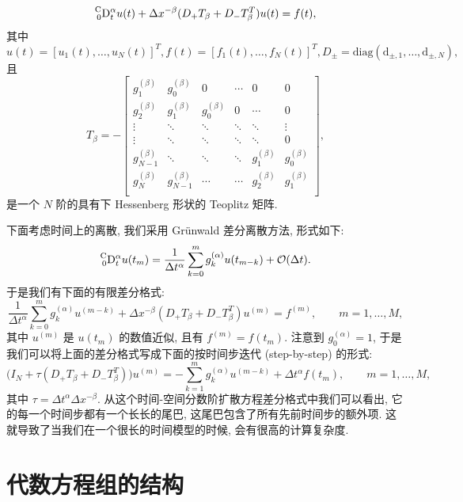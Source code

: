 \documentclass{ecnumaster}
\begin{document}
$$
  \prescript{\mathrm{C}}{0}{\mathrm{D}}_t^{\alpha}u(t) 
   + \Delta x^{-\beta}(D_+T_{\beta} + D_-T_{\beta}^T)u(t) = f(t),
$$
其中
$$ u(t) = [u_1(t), \dots, u_N(t)]^T,
  f(t) = [f_1(t), \dots, f_N(t)]^T,
  D_{\pm} = \mathrm{diag}(\mathrm{d}_{\pm, 1}, \dots, \mathrm{d}_{\pm, N}),
$$
且
\begin{equation}\label{eqtb}
T_{\beta} = - \left[ \begin{matrix} g_1^{(\beta)} & g_0^{(\beta)} & 0 & \cdots & 0 & 0 \\
g_2^{(\beta)} & g_1^{(\beta)} & g_0^{(\beta)} & 0 & \cdots &  0 \\
\vdots & \ddots & \ddots & \ddots & \ddots & \vdots\\
\vdots & \ddots & \ddots & \ddots & \ddots & 0\\
g_{N-1}^{(\beta)}& \ddots & \ddots & \ddots & g_1^{(\beta)} & g_0^{(\beta)}\\
g_{N}^{(\beta)}& g_{N-1}^{(\beta)} & \cdots & \cdots & g_2^{(\beta)} & g_1^{(\beta)}\\
\end{matrix} \right],
\end{equation}
是一个 $N$ 阶的具有下 Hessenberg 形状的 Teoplitz 矩阵.

下面考虑时间上的离散, 我们采用 Gr\"unwald 差分离散方法, 形式如下\cite{P99}:
$$
  \prescript{\mathrm{C}}{0}{\mathrm{D}}_t^{\alpha}u(t_m) =
   \frac{1}{\Delta t^{\alpha}}\sum_{k=0}^m g_k^{(\alpha)}u(t_{m-k}) + \mathcal{O}(\Delta t).
$$
于是我们有下面的有限差分格式:
\begin{equation}\label{eq313}
  \frac{1}{\Delta t^{\alpha}}\sum_{k=0}^m g_k^{(\alpha)}u^{(m-k)} 
  + \Delta x^{-\beta}(D_+T_{\beta} + D_-T_{\beta}^T)u^{(m)} = f^{(m)}, \qquad m = 1, \dots, M,
\end{equation}
其中 $u^{(m)}$ 是 $u(t_m)$ 的数值近似, 且有 $f^{(m)} = f(t_m)$.
注意到 $g_0^{(\alpha)} = 1$, 于是我们可以将上面的差分格式写成下面的按时间步迭代 (step-by-step) 的形式:
$$
  \big(I_N + \tau (D_+T_{\beta} + D_-T_{\beta}^T)\big)u^{(m)} 
  = -\sum_{k=1}^m g_k^{(\alpha)}u^{(m-k)} + \Delta t^{\alpha} f(t_m), \qquad m = 1, \dots, M,
$$
其中 $\tau=\Delta t^{\alpha}\Delta x^{-\beta}$.
从这个时间-空间分数阶扩散方程差分格式中我们可以看出,
它的每一个时间步都有一个长长的尾巴, 这尾巴包含了所有先前时间步的额外项.
这就导致了当我们在一个很长的时间模型的时候,
会有很高的计算复杂度.

\section{代数方程组的结构}
\end{document}
